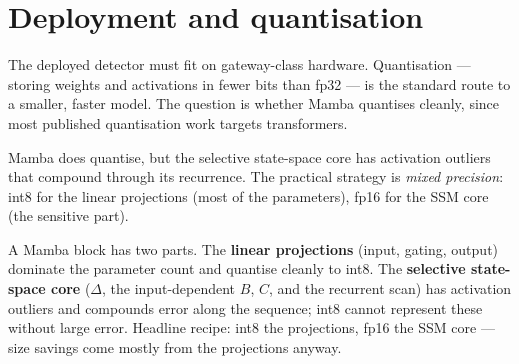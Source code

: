 \documentclass[11pt,a4paper]{article}
\begin{document}
\section{Deployment and quantisation}

The deployed detector must fit on gateway-class hardware. Quantisation --- storing weights and activations in fewer bits than fp32 --- is the standard route to a smaller, faster model. The question is whether Mamba quantises cleanly, since most published quantisation work targets transformers.

\begin{tcolorbox}[idea]
Mamba does quantise, but the selective state-space core has activation outliers that compound through its recurrence. The practical strategy is \emph{mixed precision}: int8 for the linear projections (most of the parameters), fp16 for the SSM core (the sensitive part).
\end{tcolorbox}

A Mamba block has two parts. The \textbf{linear projections} (input, gating, output) dominate the parameter count and quantise cleanly to int8. The \textbf{selective state-space core} ($\Delta$, the input-dependent $B$, $C$, and the recurrent scan) has activation outliers and compounds error along the sequence; int8 cannot represent these without large error. Headline recipe: int8 the projections, fp16 the SSM core --- size savings come mostly from the projections anyway.
\end{document}

